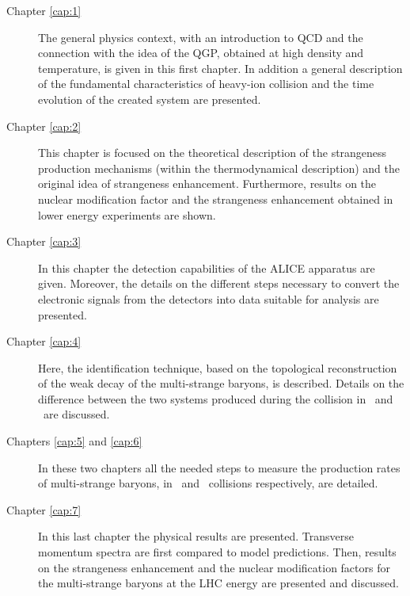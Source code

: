 \begin{description}
\item[Chapter \ref{cap:1}] The general physics context,  with an introduction to QCD and the connection with the idea of the QGP, obtained at high density and temperature, is given in this first chapter. In addition a general description of the fundamental characteristics of heavy-ion collision and the time evolution of the created system are presented. 
\item[Chapter \ref{cap:2}] This chapter is focused on the theoretical description of the strangeness production mechanisms (within the thermodynamical description) and the original idea of strangeness enhancement. Furthermore, results on the nuclear modification factor and the strangeness enhancement obtained in lower energy experiments are shown.
\item[Chapter \ref{cap:3}] In this chapter the detection capabilities of the ALICE apparatus are given. Moreover, the details on the different steps necessary to convert the electronic signals from the detectors into data suitable for analysis are presented.
\item[Chapter \ref{cap:4}] Here, the identification technique, based on the topological reconstruction of the weak decay of the multi-strange baryons, is described. Details on the difference between the two systems produced during the collision in \PbPb\ and \pp\ are discussed.
\item[Chapters \ref{cap:5} and \ref{cap:6}] In these two chapters all the needed steps to measure the production rates of multi-strange baryons, in \PbPb\ and \pp\ collisions respectively, are detailed.
\item[Chapter \ref{cap:7}] In this last chapter the physical results are presented. Transverse momentum spectra are first compared to model predictions. Then, results on the strangeness enhancement and the nuclear modification factors for the multi-strange baryons at the LHC energy are presented and discussed.
\end{description}



        
